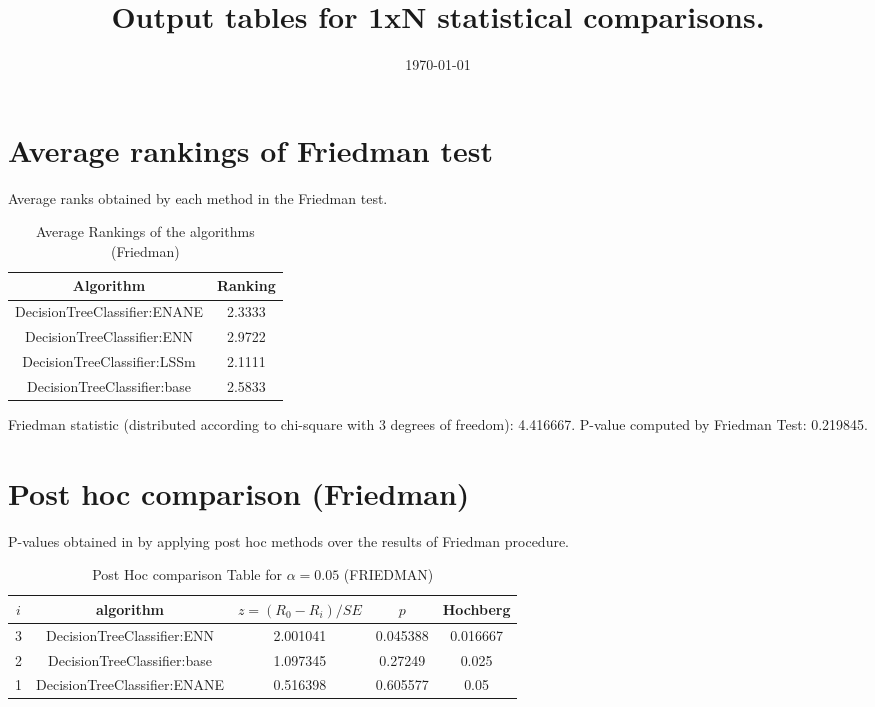\documentclass[a4paper,10pt]{article}
\title{Output tables for 1xN statistical comparisons.}
\author{}
\date{\today}
\begin{document}
\begin{landscape}
\pagestyle{empty}
\maketitle
\thispagestyle{empty}

\section{Average rankings of Friedman test}


Average ranks obtained by each method in the Friedman test.

\begin{table}[!htp]
\centering
\begin{tabular}{|c|c|}\hline
Algorithm&Ranking\\\hline
DecisionTreeClassifier:ENANE&2.3333\\DecisionTreeClassifier:ENN&2.9722\\DecisionTreeClassifier:LSSm&2.1111\\DecisionTreeClassifier:base&2.5833\\\hline\end{tabular}
\caption{Average Rankings of the algorithms (Friedman)}
\end{table}

Friedman statistic (distributed according to chi-square with 3 degrees of freedom): 4.416667. \newline P-value computed by Friedman Test: 0.219845.\newline


\newpage

\section{Post hoc comparison (Friedman)}


P-values obtained in by applying post hoc methods over the results of Friedman procedure.

\begin{table}[!htp]
\centering\footnotesize
\begin{tabular}{ccccc}
$i$&algorithm&$z=(R_0 - R_i)/SE$&$p$&Hochberg \\
\hline3&DecisionTreeClassifier:ENN&2.001041&0.045388&0.016667\\2&DecisionTreeClassifier:base&1.097345&0.27249&0.025\\1&DecisionTreeClassifier:ENANE&0.516398&0.605577&0.05\\\hline
\end{tabular}
\caption{Post Hoc comparison Table for $\alpha=0.05$ (FRIEDMAN)}
\end{table}
\newpage


\end{landscape}
\end{document}
